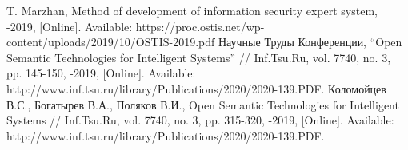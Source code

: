 \begin{thebibliography}{}
T. Marzhan, Method of development of information security expert system, -2019, [Online].
Available: https://proc.ostis.net/wp-content/uploads/2019/10/OSTIS-2019.pdf
Научные Труды Конференции, “Open Semantic Technologies for Intelligent Systems”
// Inf.Tsu.Ru, vol. 7740, no. 3, pp. 145-150, -2019,
[Online]. Available: http://www.inf.tsu.ru/library/Publications/2020/2020-139.PDF.
Коломойцев В.С., Богатырев В.А., Поляков В.И., Open Semantic Technologies for Intelligent Systems
// Inf.Tsu.Ru, vol. 7740, no. 3, pp. 315-320, -2019,
[Online]. Available: http://www.inf.tsu.ru/library/Publications/2020/2020-139.PDF.
\end{thebibliography}



